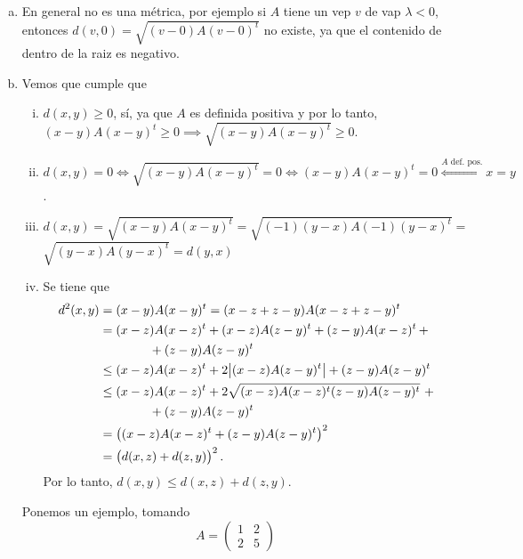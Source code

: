 \begin{eje}
\begin{enumerate}[(a)]
        \item En general no es una m\'etrica, por ejemplo si $A$ tiene un vep $v$ de vap $\lambda < 0$, entonces $d(v, 0) = \sqrt{(v - 0) A (v-0)^t}$ no existe,
            ya que el contenido de dentro de la raiz es negativo.
        \item Vemos que cumple que
            \begin{enumerate}[i)]
                \item $d(x, y) \geq 0$, sí, ya que $A$ es definida positiva y por lo tanto, $(x-y)A(x-y)^t \geq 0 \implies \sqrt{(x-y)A(x-y)^t} \geq 0$.
                \item $d(x, y) = 0 \iff \sqrt{(x-y)A(x-y)^t} = 0 \iff (x-y)A(x-y)^t = 0 \stackrel{A \text{ def. pos.}}{\iff} x = y$.
                \item $d(x, y) = \sqrt{(x-y)A(x-y)^t} = \sqrt{(-1)(y-x)A(-1)(y-x)^t} =$ \\ $\sqrt{(y-x)A(y-x)^t} = d(y, x)$
                \item Se tiene que
                    \begin{align*}
                        d^2(x,y) &= (x-y)A(x-y)^t = (x-z+z-y)A(x-z+z-y)^t \\
                        &= (x-z)A(x-z)^t + (x-z)A(z-y)^t + (z-y)A(x-z)^t\, + \\
                        &\qquad\qquad + (z-y)A(z-y)^t \\
                        &\leq (x-z)A(x-z)^t + 2 \abs{(x-z)A(z-y)^t} + (z-y)A(z-y)^t \\
                        &\leq (x-z)A(x-z)^t + 2 \sqrt{(x-z)A(x-z)^t(z-y)A(z-y)^t} \,\,+ \\
                        &\qquad\qquad + (z-y)A(z-y)^t \\
                        &= \left( (x-z)A(x-z)^t + (z-y)A(z-y)^t \right)^2 \\
                        &= \left( d(x,z) + d(z,y) \right)^2.
                    \end{align*}
                    Por lo tanto, $d(x,y) \leq d(x,z) + d(z,y)$.
            \end{enumerate}
            Ponemos un ejemplo, tomando
            \[
                A =
                \begin{pmatrix}
                    1 & 2 \\
                    2 & 5
                \end{pmatrix}
            \]
            \begin{center}
                
            \end{center}
    \end{enumerate}
\end{eje}

